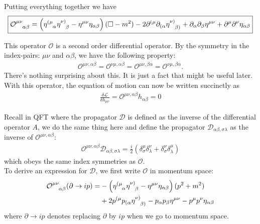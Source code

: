\documentclass{book}
\theoremstyle{definition}
\newcommand{\p}{\partial}
\newcommand{\lag}{\mathcal{L}}
\newcommand{\nn}{\nonumber}
\newcommand{\f}[2]{\frac{#1}{#2}}
\newcommand{\lp}{\left(}
\newcommand{\rp}{\right)}
\newcommand{\D}{\mathcal{D}}
\begin{document}
Putting everything together we have
\begin{align}
\boxed{\tensor{\mathcal{O}}{^{\mu\nu}_{\alpha\beta}} = \lp \tensor{\eta}{^{(\mu}_\alpha}\tensor{\eta}{^{\nu)}_\beta}  - \eta^{\mu\nu}\eta_{\alpha\beta} \rp (\square - m^2) -2\p^{(\mu} \p_{(\alpha} \tensor{\eta}{^{\nu)}_{\beta)}} + \p_\alpha \p_\beta \eta^{\mu\nu} + \p^\mu\p^\nu \eta_{\alpha\beta}}
\end{align}


This operator $\mathcal{O}$ is a second order differential operator. By the symmetry in the index-pairs: $\mu\nu$ and $\alpha\beta$, we have the following property:
\begin{align}
\mathcal{O}^{\mu\nu,\alpha\beta} = \mathcal{O}^{\nu\mu,\alpha\beta} = \mathcal{O}^{\mu\nu,\beta\alpha} = \mathcal{O}^{\nu\mu,\beta\alpha}.
\end{align}
There's nothing surprising about this. It is just a fact that might be useful later. \\

With this operator, the equation of motion can now be written succinctly as
\begin{align}
\boxed{\f{\delta \lag}{\delta h_{\mu\nu}} = \mathcal{O}^{\mu\nu,\alpha\beta}h_{\alpha\beta}= 0} 
\end{align}

Recall in QFT where the propagator $\D$ is defined as the inverse of the differential operator $A$, we do the same thing here and define the propagator $\D_{\alpha\beta,\sigma\lambda}$ as the inverse of $\mathcal{O}^{\mu\nu,\alpha\beta}$:
\begin{align}
\boxed{\mathcal{O}^{\mu\nu,\alpha\beta}\D_{\alpha\beta,\sigma\lambda} = \f{i}{2}\lp \delta^\mu_\sigma \delta^\nu_\lambda + \delta^\nu_\sigma\delta^\mu_\lambda \rp}
\end{align}
which obeys the same index symmetries as $\mathcal{O}$.\\

To derive an expression for $\D$, we first write $\mathcal{O}$ in momentum space:
\begin{align}
\tensor{\mathcal{O}}{^{\mu\nu}_{\alpha\beta}}(\p \to ip) = &-\lp \tensor{\eta}{^{(\mu}_\alpha}\tensor{\eta}{^{\nu)}_\beta}  - \eta^{\mu\nu}\eta_{\alpha\beta} \rp (p^2 + m^2)\nn\\
&+2p^{(\mu} p_{(\alpha} \tensor{\eta}{^{\nu)}_{\beta)}} - p_\alpha p_\beta \eta^{\mu\nu} - p^\mu p^\nu \eta_{\alpha\beta}
\end{align}
where $\p \to ip$ denotes replacing $\p$ by $ip$ when we go to momentum space. \\
\end{document}
